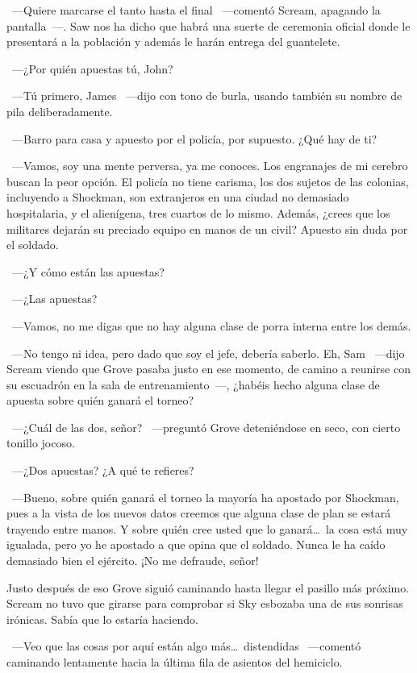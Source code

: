 ~---Quiere marcarse el tanto hasta el final ~---comentó Scream, apagando la pantalla~---. Saw nos ha dicho que habrá una suerte de ceremonia oficial donde le presentará a la población y además le harán entrega del guantelete.

~---¿Por quién apuestas tú, John?

~---Tú primero, James ~---dijo con tono de burla, usando también su nombre de pila deliberadamente.

~---Barro para casa y apuesto por el policía, por supuesto. ¿Qué hay de ti?

~---Vamos, soy una mente perversa, ya me conoces. Los engranajes de mi cerebro buscan la peor opción. El policía no tiene carisma, los dos sujetos de las colonias, incluyendo a Shockman, son extranjeros en una ciudad no demasiado hospitalaria, y el alienígena, tres cuartos de lo mismo. Además, ¿crees que los militares dejarán su preciado equipo en manos de un civil? Apuesto sin duda por el soldado.

~---¿Y cómo están las apuestas?

~---¿Las apuestas?

~---Vamos, no me digas que no hay alguna clase de porra interna entre los demás.

~---No tengo ni idea, pero dado que soy el jefe, debería saberlo. Eh, Sam ~---dijo Scream viendo que Grove pasaba justo en ese momento, de camino a reunirse con su escuadrón en la sala de entrenamiento~---, ¿habéis hecho alguna clase de apuesta sobre quién ganará el torneo?

~---¿Cuál de las dos, señor? ~---preguntó Grove deteniéndose en seco, con cierto tonillo jocoso.

~---¿Dos apuestas? ¿A qué te refieres?

~---Bueno, sobre quién ganará el torneo la mayoría ha apostado por Shockman, pues a la vista de los nuevos datos creemos que alguna clase de plan se estará trayendo entre manos. Y sobre quién cree usted que lo ganará\dots\ la cosa está muy igualada, pero yo he apostado a que opina que el soldado. Nunca le ha caído demasiado bien el ejército. ¡No me defraude, señor!

Justo después de eso Grove siguió caminando hasta llegar el pasillo más próximo. Scream no tuvo que girarse para comprobar si Sky esbozaba una de sus sonrisas irónicas. Sabía que lo estaría haciendo.

~---Veo que las cosas por aquí están algo más\dots\ distendidas ~---comentó caminando lentamente hacia la última fila de asientos del hemiciclo.

